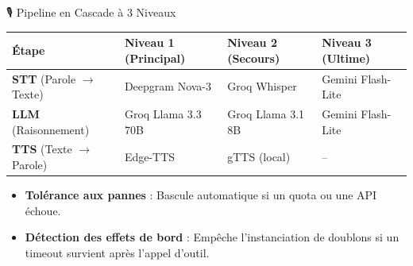 \documentclass[aspectratio=169]{beamer}
\begin{document}
\begin{frame}{🎙️ Pipeline en Cascade à 3 Niveaux}
  \begin{table}
    \centering
    \begin{tabular}{llll}
      \toprule
      \textbf{Étape} & \textbf{Niveau 1 (Principal)} & \textbf{Niveau 2 (Secours)} & \textbf{Niveau 3 (Ultime)} \\
      \midrule
      \textbf{STT} (Parole $\rightarrow$ Texte) & Deepgram Nova-3 & Groq Whisper & Gemini Flash-Lite \\
      \textbf{LLM} (Raisonnement) & Groq Llama 3.3 70B & Groq Llama 3.1 8B & Gemini Flash-Lite \\
      \textbf{TTS} (Texte $\rightarrow$ Parole) & Edge-TTS & gTTS (local) & -- \\
      \bottomrule
    \end{tabular}
  \end{table}

  \begin{itemize}
    \item \textbf{Tolérance aux pannes} : Bascule automatique si un quota ou une API échoue.
    \item \textbf{Détection des effets de bord} : Empêche l'instanciation de doublons si un timeout survient après l'appel d'outil.
  \end{itemize}

\end{frame}
\end{document}
